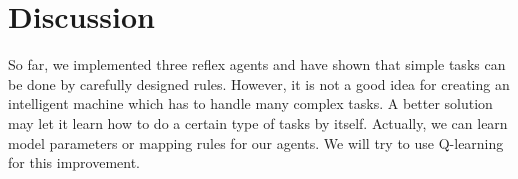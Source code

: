 \documentclass[12pt]{article}
\begin{document}





\section{Discussion}
So far, we implemented three reflex agents and have shown that simple tasks can be done by carefully designed rules. However, it is not a good idea for creating an intelligent machine which has to handle many complex tasks. A better solution may let it learn how to do a certain type of tasks by itself. Actually, we can learn model parameters or mapping rules for our agents. We will try to use Q-learning for this improvement.



\end{document}
